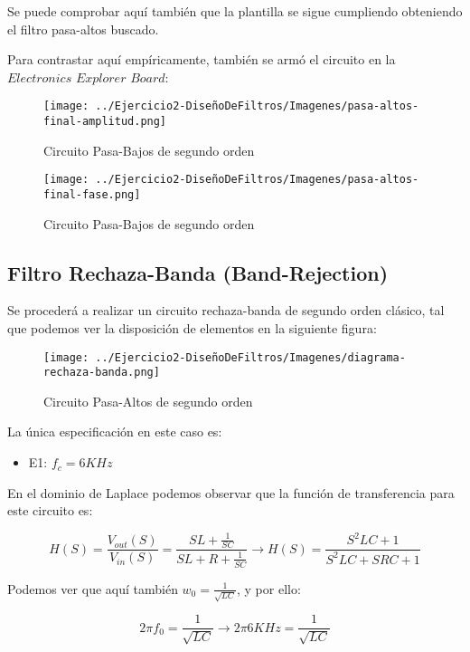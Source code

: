 Se puede comprobar aquí también que la plantilla se sigue cumpliendo obteniendo el filtro pasa-altos buscado.

Para contrastar aquí empíricamente, también se armó el circuito en la $Electronics$ $Explorer$ $Board$:

\begin{figure}[H]
    \centering
    \texttt{[image: ../Ejercicio2-DiseñoDeFiltros/Imagenes/pasa-altos-final-amplitud.png]}
    \caption{Circuito Pasa-Bajos de segundo orden}
\end{figure}

\begin{figure}[H]
    \centering
    \texttt{[image: ../Ejercicio2-DiseñoDeFiltros/Imagenes/pasa-altos-final-fase.png]}
    \caption{Circuito Pasa-Bajos de segundo orden}
\end{figure}



\subsection{Filtro Rechaza-Banda (Band-Rejection)}

Se procederá a realizar un circuito rechaza-banda de segundo orden clásico, tal que podemos
ver la disposición de elementos en la siguiente figura:

\begin{figure}[H]
    \centering
    \texttt{[image: ../Ejercicio2-DiseñoDeFiltros/Imagenes/diagrama-rechaza-banda.png]}
    \caption{Circuito Pasa-Altos de segundo orden}
\end{figure}

La única especificación en este caso es:

\begin{itemize}
	\item E1: $f_c=6 KHz$
\end{itemize}

En el dominio de Laplace podemos observar que la función de transferencia para este circuito es:

$$H(S)=\frac{V_{out}(S)}{V_{in}(S)}=\frac{SL+\frac{1}{SC}}{SL+R+\frac{1}{SC}} \longrightarrow H(S)=\frac{S^{2}LC+1}{S^2LC+SRC+1}$$

Podemos ver que aquí también $w_0=\frac{1}{\sqrt{LC}}$, y por ello:

$$2 \pi f_0 = \frac{1}{\sqrt{LC}} \longrightarrow 2 \pi 6KHz = \frac{1}{\sqrt{LC}}$$

